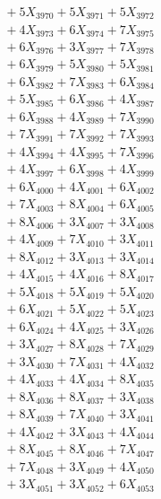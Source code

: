\documentclass[a4paper,10pt]{article}
\begin{document}
{\begin{align}
&\;  + 5 X_{3970} + 5 X_{3971} + 5 X_{3972} \\[0.3ex]
&\;  + 4 X_{3973} + 6 X_{3974} + 7 X_{3975} \\[0.3ex]
&\;  + 6 X_{3976} + 3 X_{3977} + 7 X_{3978} \\[0.3ex]
&\;  + 6 X_{3979} + 5 X_{3980} + 5 X_{3981} \\[0.3ex]
&\;  + 6 X_{3982} + 7 X_{3983} + 6 X_{3984} \\[0.3ex]
&\;  + 5 X_{3985} + 6 X_{3986} + 4 X_{3987} \\[0.3ex]
&\;  + 6 X_{3988} + 4 X_{3989} + 7 X_{3990} \\[0.3ex]
&\;  + 7 X_{3991} + 7 X_{3992} + 7 X_{3993} \\[0.3ex]
&\;  + 4 X_{3994} + 4 X_{3995} + 7 X_{3996} \\[0.3ex]
&\;  + 4 X_{3997} + 6 X_{3998} + 4 X_{3999} \\[0.5ex]\allowbreak
&\;  + 6 X_{4000} + 4 X_{4001} + 6 X_{4002} \\[0.3ex]
&\;  + 7 X_{4003} + 8 X_{4004} + 6 X_{4005} \\[0.3ex]
&\;  + 8 X_{4006} + 3 X_{4007} + 3 X_{4008} \\[0.3ex]
&\;  + 4 X_{4009} + 7 X_{4010} + 3 X_{4011} \\[0.3ex]
&\;  + 8 X_{4012} + 3 X_{4013} + 3 X_{4014} \\[0.3ex]
&\;  + 4 X_{4015} + 4 X_{4016} + 8 X_{4017} \\[0.3ex]
&\;  + 5 X_{4018} + 5 X_{4019} + 5 X_{4020} \\[0.3ex]
&\;  + 6 X_{4021} + 5 X_{4022} + 5 X_{4023} \\[0.3ex]
&\;  + 6 X_{4024} + 4 X_{4025} + 3 X_{4026} \\[0.3ex]
&\;  + 3 X_{4027} + 8 X_{4028} + 7 X_{4029} \\[0.5ex]\allowbreak
&\;  + 3 X_{4030} + 7 X_{4031} + 4 X_{4032} \\[0.3ex]
&\;  + 4 X_{4033} + 4 X_{4034} + 8 X_{4035} \\[0.3ex]
&\;  + 8 X_{4036} + 8 X_{4037} + 3 X_{4038} \\[0.3ex]
&\;  + 8 X_{4039} + 7 X_{4040} + 3 X_{4041} \\[0.3ex]
&\;  + 4 X_{4042} + 3 X_{4043} + 4 X_{4044} \\[0.3ex]
&\;  + 8 X_{4045} + 8 X_{4046} + 7 X_{4047} \\[0.3ex]
&\;  + 7 X_{4048} + 3 X_{4049} + 4 X_{4050} \\[0.3ex]
&\;  + 3 X_{4051} + 3 X_{4052} + 6 X_{4053} \\[0.3ex]

\end{align}}
\end{document}

